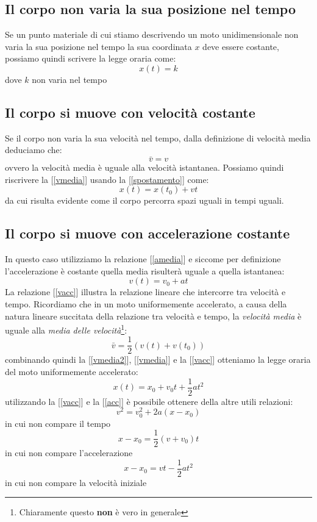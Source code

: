\documentclass[a4paper,10pt,oneside]{article}
\begin{document}
\subsection*{Il corpo non varia la sua posizione nel tempo}
Se un punto materiale di cui stiamo descrivendo un moto unidimensionale non varia la sua posizione nel tempo la sua coordinata $x$ deve essere costante, possiamo quindi scrivere la legge oraria come:
\begin{equation}
 x(t)=k
\end{equation}
dove $k$ non varia nel tempo
\subsection*{Il corpo si muove con velocità costante}
Se il corpo non varia la sua velocità nel tempo, dalla definizione di velocità media deduciamo che:
\begin{equation}
 \bar{v}=v
\end{equation}
ovvero la velocità media è uguale alla velocità istantanea. Possiamo quindi riscrivere la [\ref{vmedia}] usando la [\ref{spostamento}] come:
\begin{equation}
 x(t)=x(t_0)+vt
\end{equation}
da cui risulta evidente come il corpo percorra spazi uguali in tempi uguali.
\subsection*{Il corpo si muove con accelerazione costante}
In questo caso utilizziamo la relazione [\ref{amedia}] e siccome per definizione l'accelerazione è costante quella media risulterà uguale a quella istantanea:
\begin{equation}\label{vacc}
 v(t)=v_0+a t
\end{equation}
La relazione [\ref{vacc}] illustra la relazione lineare che intercorre tra velocità e tempo. Ricordiamo che in un moto uniformemente accelerato, a causa della natura lineare succitata della relazione tra velocità e tempo, la \emph{velocità media} è uguale alla \emph{media delle velocità}\footnote{Chiaramente questo \textbf{non} è vero in generale}:
\begin{equation}\label{vmedia2}
 \bar{v}=\frac{1}{2}\left(v(t)+v(t_0)\right)
\end{equation}
combinando quindi la [\ref{vmedia2}], [\ref{vmedia}] e la [\ref{vacc}]   otteniamo la legge oraria del moto uniformemente accelerato:
\begin{equation}\label{acc}
 x(t)=x_0+v_0  t +\frac 1 2 a t^2
\end{equation}
utilizzando la [\ref{vacc}] e la [\ref{acc}] è possibile ottenere della altre utili relazioni:
\begin{equation}
 v^2=v_0^2+2a(x-x_0)
\end{equation}
in cui non compare il tempo
\begin{equation}
 x-x_0=\frac 1 2(v+v_0)t
\end{equation}
in cui non compare l'accelerazione
\begin{equation}
 x-x_0=vt-\frac 1 2 a t^2
\end{equation}
in cui non compare la velocità iniziale
\end{document}
